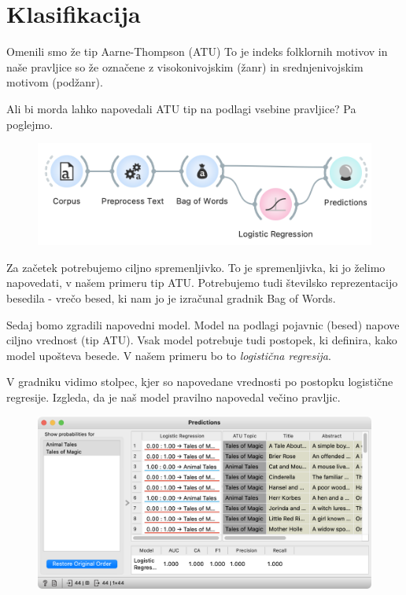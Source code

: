 \chapter{Klasifikacija}
\label{ch:klasifikacija}

Omenili smo že tip Aarne-Thompson (ATU) To je indeks folklornih motivov in naše pravljice so že označene z visokonivojskim (žanr) in srednjenivojskim motivom (podžanr).

Ali bi morda lahko napovedali ATU tip na podlagi vsebine pravljice? Pa poglejmo.

\begin{figure}[h]
    \centering
    \includegraphics[width=0.9\linewidth]{klasifikacija-wf.png}%
    \caption{ }
    \label{fig:002-stop-words}
\end{figure}

Za začetek potrebujemo ciljno spremenljivko. To je spremenljivka, ki jo želimo napovedati, v našem primeru tip ATU. Potrebujemo tudi številsko reprezentacijo besedila - vrečo besed, ki nam jo je izračunal gradnik Bag of Words.

Sedaj bomo zgradili napovedni model. Model na podlagi pojavnic (besed) napove ciljno vrednost (tip ATU). Vsak model potrebuje tudi postopek, ki definira, kako model upošteva besede. V našem primeru bo to \textit{logistična regresija}.

V gradniku  vidimo stolpec, kjer so napovedane vrednosti po postopku logistične regresije. Izgleda, da je naš model pravilno napovedal večino pravljic.

\begin{figure}[h]
    \centering
    \includegraphics[width=0.95\linewidth]{predictions.png}%
    \caption{ }
    \label{fig:002-word-cloud}
\end{figure}